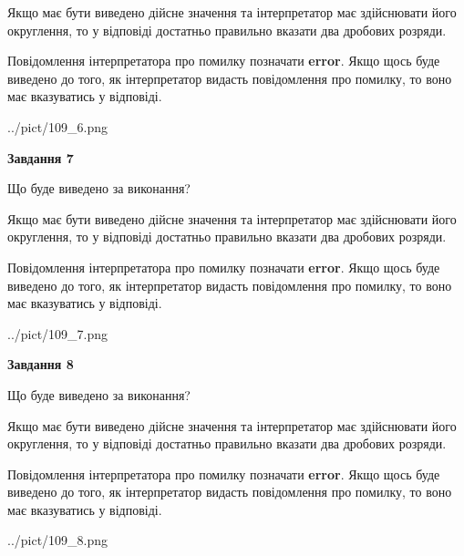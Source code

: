 \documentclass[12pt, ukrainian]{article}
\begin{document}
{\begin {Large}
Якщо має бути виведено дійсне значення та інтерпретатор має здійснювати його округлення, 
то у відповіді достатньо правильно вказати два дробових розряди.

Повідомлення інтерпретатора про помилку позначати \textbf{error}.
Якщо щось буде виведено до того, як інтерпретатор видасть повідомлення про помилку, 
то воно має вказуватись у відповіді. \par

\begin{center}
	{../pict/109_6.png}
\end{center}
\newpage

{\begin {center}\textbf{Завдання 7}\end {center}}\par
Що буде виведено за виконання? \par

Якщо має бути виведено дійсне значення та інтерпретатор має здійснювати його округлення, 
то у відповіді достатньо правильно вказати два дробових розряди.

Повідомлення інтерпретатора про помилку позначати \textbf{error}.
Якщо щось буде виведено до того, як інтерпретатор видасть повідомлення про помилку, 
то воно має вказуватись у відповіді. \par

\begin{center}
	{../pict/109_7.png}
\end{center}
\newpage

{\begin {center}\textbf{Завдання 8}\end {center}}\par
Що буде виведено за виконання? \par

Якщо має бути виведено дійсне значення та інтерпретатор має здійснювати його округлення, 
то у відповіді достатньо правильно вказати два дробових розряди.

Повідомлення інтерпретатора про помилку позначати \textbf{error}.
Якщо щось буде виведено до того, як інтерпретатор видасть повідомлення про помилку, 
то воно має вказуватись у відповіді. \par

\begin{center}
	{../pict/109_8.png}
\end{center}
\newpage


\end{Large}}
\end{document}
